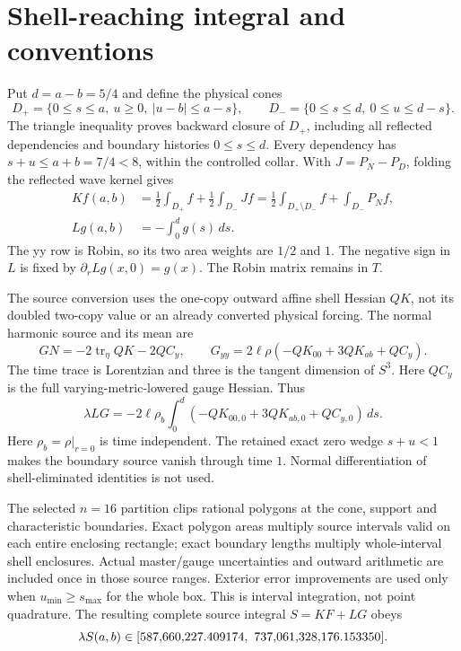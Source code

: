 \documentclass[11pt]{article}
\begin{document}
\section{Shell-reaching integral and conventions}
Put $d=a-b=5/4$ and define the physical cones
\[
D_+=\{0\le s\le a,\ u\ge0,\ |u-b|\le a-s\},\qquad
D_-=\{0\le s\le d,\ 0\le u\le d-s\}.
\]
The triangle inequality proves backward closure of $D_+$, including all
reflected dependencies and boundary histories $0\le s\le d$.
Every dependency has $s+u\le a+b=7/4<8$, within the controlled collar.
With $J=P_N-P_D$, folding the reflected wave kernel gives
\begin{align*}
Kf(a,b)&=\tfrac12\int_{D_+}f+\tfrac12\int_{D_-}Jf
       =\tfrac12\int_{D_+\setminus D_-}f+\int_{D_-}P_Nf,\\
Lg(a,b)&=-\int_0^d g(s)\,ds.
\end{align*}
The yy row is Robin, so its two area weights are $1/2$ and $1$.
The negative sign in $L$ is fixed by
$\partial_r Lg(x,0)=g(x)$. The Robin matrix remains in $T$.

The source conversion uses the one-copy outward affine shell Hessian $QK$,
not its doubled two-copy value or an already converted physical forcing.
The normal harmonic source and its mean are
\[
GN=-2\operatorname{tr}_{\eta}QK-2QC_y,\qquad
G_{yy}=2\ell\rho(-QK_{00}+3QK_{ab}+QC_y).
\]
The time trace is Lorentzian and three is the tangent dimension of $S^3$.
Here $QC_y$ is the full varying-metric-lowered gauge Hessian. Thus
\[
\lambda LG=-2\ell\rho_b\int_0^d
   (-QK_{00,0}+3QK_{ab,0}+QC_{y,0})\,ds.
\]
Here $\rho_b=\rho|_{r=0}$ is time independent. The retained exact zero wedge
$s+u<1$ makes the boundary source vanish
through time $1$. Normal differentiation of shell-eliminated identities
is not used.

The selected $n=16$ partition clips rational polygons at the cone, support
and characteristic boundaries. Exact polygon areas multiply source intervals
valid on each entire enclosing rectangle; exact boundary lengths multiply
whole-interval shell enclosures. Actual master/gauge uncertainties and
outward arithmetic are included once in those source ranges. Exterior error
improvements are used only when $u_{\min}\ge s_{\max}$ for the whole box.
This is interval integration, not point quadrature. The resulting complete
source integral $S=KF+LG$ obeys
\begin{equation}\label{eq:source}
\lambda S(a,b)\in[587{,}660{,}227.409174,\ 737{,}061{,}328{,}176.153350].
\end{equation}
\end{document}
